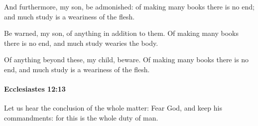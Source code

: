 			\begin{versebox}
					\item[BHS] 
					\item[LXX] 
					\item[ASV] And furthermore, my son, be admonished: of making many books there is no end; and much study is a weariness of the flesh.
					\item[NIV] Be warned, my son, of anything in addition to them. Of making many books there is no end, and much study wearies the body.
					\item[NRSV] Of anything beyond these, my child, beware. Of making many books there is no end, and much study is a weariness of the flesh.
			\end{versebox}

		\paragraph{Ecclesiastes 12:13} %
			\label{ECCLESIASTES-12-13}

			Let us hear the conclusion of the whole matter: Fear God, and keep his commandments: for this is the whole duty of man.

